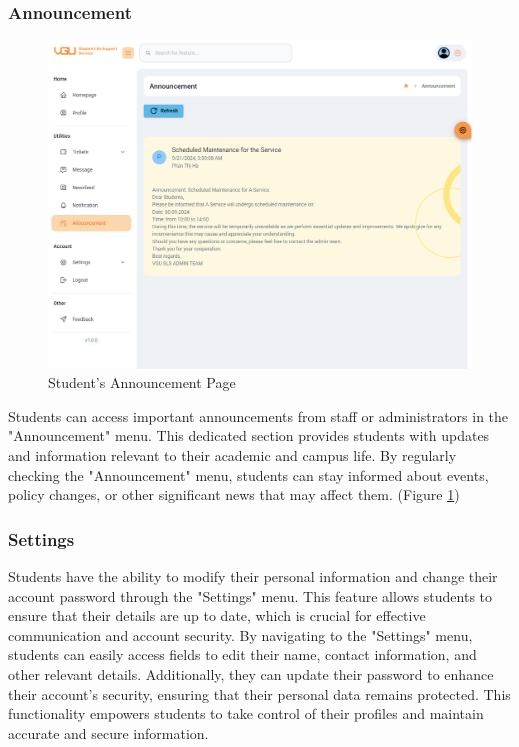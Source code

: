 	\subsubsection{Announcement}
	\begin{figure}[H]
		\centering
		\includegraphics[width=1.0\linewidth]{graphics/gui/student/announcement}
		\caption{Student's Announcement Page}
		\label{fig:gui-std-announcement}
	\end{figure}
	
	Students can access important announcements from staff or administrators in the "Announcement" menu. This dedicated section provides students with updates and information relevant to their academic and campus life. By regularly checking the "Announcement" menu, students can stay informed about events, policy changes, or other significant news that may affect them. (Figure \ref{fig:gui-std-announcement})
	
	
	\subsubsection{Settings}
	Students have the ability to modify their personal information and change their account password through the "Settings" menu. This feature allows students to ensure that their details are up to date, which is crucial for effective communication and account security. By navigating to the "Settings" menu, students can easily access fields to edit their name, contact information, and other relevant details. Additionally, they can update their password to enhance their account's security, ensuring that their personal data remains protected. This functionality empowers students to take control of their profiles and maintain accurate and secure information.
	
